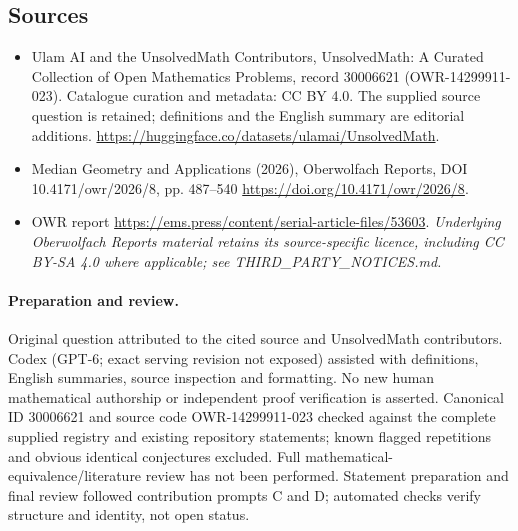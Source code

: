 \documentclass[11pt]{article}
\begin{document}
\subsection{Sources}
\begin{itemize}
\item[\hypertarget{source:30006621:1}{S1}] Ulam AI and the UnsolvedMath Contributors, UnsolvedMath: A Curated Collection of Open Mathematics Problems, record 30006621 (OWR-14299911-023). Catalogue curation and metadata: CC BY 4.0. The supplied source question is retained; definitions and the English summary are editorial additions.
\url{https://huggingface.co/datasets/ulamai/UnsolvedMath}.
\item[\hypertarget{source:30006621:2}{S2}] Median Geometry and Applications (2026), Oberwolfach Reports, DOI 10.4171/owr/2026/8, pp. 487--540
\url{https://doi.org/10.4171/owr/2026/8}.
\item[\hypertarget{source:30006621:3}{S3}] OWR report
\url{https://ems.press/content/serial-article-files/53603}.
\textit{Underlying Oberwolfach Reports material retains its source-specific licence, including CC BY-SA 4.0 where applicable; see THIRD\_PARTY\_NOTICES.md.}
\end{itemize}
\paragraph{Preparation and review.}
Original question attributed to the cited source and UnsolvedMath contributors. Codex (GPT-6; exact serving revision not exposed) assisted with definitions, English summaries, source inspection and formatting. No new human mathematical authorship or independent proof verification is asserted. Canonical ID 30006621 and source code OWR-14299911-023 checked against the complete supplied registry and existing repository statements; known flagged repetitions and obvious identical conjectures excluded. Full mathematical-equivalence/literature review has not been performed. Statement preparation and final review followed contribution prompts C and D; automated checks verify structure and identity, not open status.
\label{end:30006621}
\end{document}
